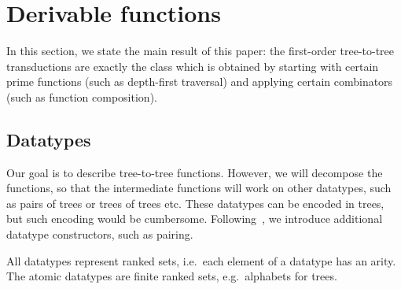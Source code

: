 \section{Derivable functions}\label{sec:derivable-functions}
In this section, we state the main result of this paper: the  first-order tree-to-tree transductions are exactly the class which is obtained by starting with certain prime functions (such as depth-first traversal) and applying certain  combinators (such as function composition). 

\subsection{Datatypes}
\label{sec:datatype-constructors}
 Our goal is to describe tree-to-tree functions. However, we will decompose the functions, so that the   intermediate functions will work on other datatypes, such as pairs of trees or trees of trees etc. These datatypes  can be encoded in trees, but such encoding would be cumbersome. Following~\cite{bojanczykRegularFirstOrderList2018}, we  introduce additional  datatype constructors, such as pairing.

All datatypes represent ranked sets, i.e.~each element of a datatype has an arity. The atomic datatypes are finite ranked sets, e.g.~alphabets for trees. 

